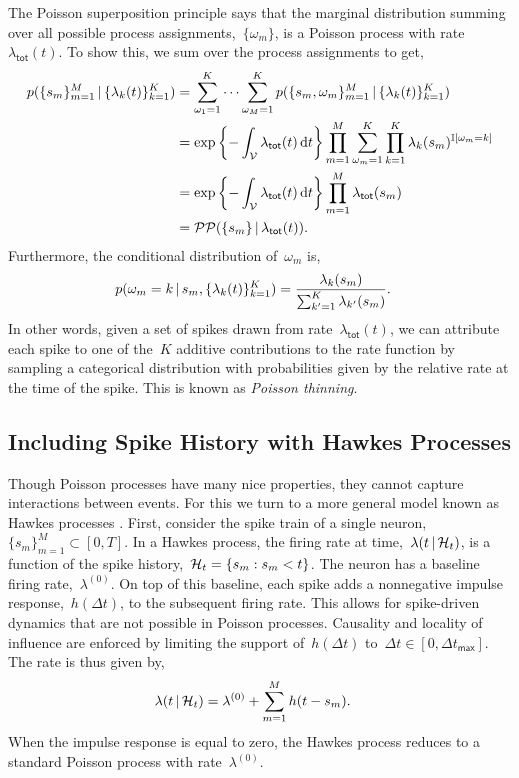 The Poisson superposition principle says that the marginal distribution
summing over all possible process assignments,~$\{\omega_m\}$, is a Poisson
process with rate~$\lambda_{\mathsf{tot}}(t)$. To show this, we sum over
the process assignments to get,
\begin{align*}
  p(\{s_m\}_{m=1}^M \,|\, \{\lambda_k(t)\}_{k=1}^K)
  &= \sum_{\omega_1=1}^K \cdots \sum_{\omega_M=1}^K p(\{s_m, \omega_m\}_{m=1}^M \,|\, \{\lambda_k(t)\}_{k=1}^K) \\
  &= \exp\left\{-\int_{\mathcal{V}} \lambda_{\mathsf{tot}}(t) \, \mathrm{d}t\right\}
  \prod_{m=1}^M \sum_{\omega_m=1}^K \prod_{k=1}^K \lambda_k(s_m)^{\mathbb{I}[\omega_m = k]} \\
  &= \exp\left\{-\int_{\mathcal{V}} \lambda_{\mathsf{tot}}(t) \, \mathrm{d}t\right\}
  \prod_{m=1}^M \lambda_{\mathsf{tot}}(s_m) \\
  &= \mathcal{PP}(\{s_m\} \,|\, \lambda_{\mathsf{tot}}(t)).
\end{align*}
Furthermore, the conditional distribution of~$\omega_m$ is,
\begin{align*}
  p(\omega_m=k \,|\, s_m, \{\lambda_k(t)\}_{k=1}^K)
  &= \frac{\lambda_k(s_m)}{\sum_{k'=1}^K \lambda_{k'}(s_m)}.
\end{align*}
In other words, given a set of spikes drawn from rate~$\lambda_{\mathsf{tot}}(t)$,
we can attribute each spike to one of the~$K$ additive contributions
to the rate function by sampling a categorical distribution with probabilities
given by the relative rate at the time of the spike. This is known as
\emph{Poisson thinning}.

\subsection{Including Spike History with Hawkes Processes}
Though Poisson processes have many nice properties, they cannot
capture interactions between events. For this we turn to a more
general model known as Hawkes processes \cite{Hawkes-1971}. 
First, consider the spike train of a single neuron,~$\{s_m\}_{m=1}^M \subset [0,T]$.
In a Hawkes process, the firing rate at time,~$\lambda(t \,|\, \mathcal{H}_t)$, is a function of 
the spike history,~${\mathcal{H}_t = \{s_m: s_m < t\}}$.  The neuron has a 
baseline firing rate,~$\lambda^{(0)}$. On top of this baseline, 
each spike 
adds a nonnegative impulse response,~$h(\Delta t)$, to the 
subsequent firing rate.  This allows for spike-driven dynamics that are not possible in Poisson
processes.  Causality and
locality of influence are enforced by limiting the support of~$h(\Delta
t)$ to~${\Delta t \in [0,\Delta t_{\mathsf{max}}]}$.
The rate is thus given by,
\begin{align*}
  \lambda(t \,|\, \mathcal{H}_t)
  &= \lambda^{(0)} + \sum_{m=1}^M h(t - s_m).
\end{align*}
When the impulse response is equal to zero, the Hawkes process
reduces to a standard Poisson process with rate~$\lambda^{(0)}$.

